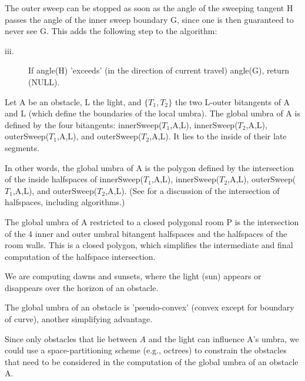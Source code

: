 \documentclass[12pt]{article}
\begin{document}
The outer sweep can be stopped as soon as the angle of the sweeping tangent H
passes the angle of the inner sweep boundary G,
since one is then guaranteed to never see G.
This adds the following step to the algorithm:

\begin{description}
\item[iii.]	If angle(H) 'exceeds' (in the direction of current travel) angle(G), return (NULL).
\end{description}


\begin{theorem}
Let A be an obstacle, L the light, and $\{T_1,T_2\}$ the two L-outer bitangents
of A and L (which define the boundaries of the local umbra).
The global umbra of A is defined by  
the four bitangents:
innerSweep($T_1$,A,L), innerSweep($T_2$,A,L),
outerSweep($T_1$,A,L), and outerSweep($T_2$,A,L).
It lies to the inside of their late segments.

In other words, the global umbra of A is the polygon defined by the intersection
of the inside halfspaces of innerSweep($T_1$,A,L), innerSweep($T_2$,A,L),
outerSweep($T_1$,A,L), and outerSweep($T_2$,A,L).
(See \cite{preparataShamos} for a discussion of the
intersection of halfspaces, including algorithms.)
\end{theorem}

\begin{rmk}
The global umbra of A restricted to a closed polygonal room P is 
the intersection of the 4 inner and outer umbral bitangent halfspaces
and the halfspaces of the room walls.
This is a closed polygon, which simplifies the intermediate and final
computation of the halfspace intersection.
\end{rmk}

\begin{rmk}
We are computing dawns and sunsets, where the light (sun) appears or disappears
over the horizon of an obstacle.
\end{rmk}

\begin{rmk}
The global umbra of an obstacle is 'pseudo-convex' (convex except for boundary of curve),
another simplifying advantage.
\end{rmk}

\begin{rmk}
Since only obstacles that lie between $A$ and the light can influence A's umbra,
we could use a space-partitioning scheme (e.g., octrees) to constrain
the obstacles that need to be considered in the computation of the global
umbra of an obstacle A.
\end{rmk}
\end{document}

